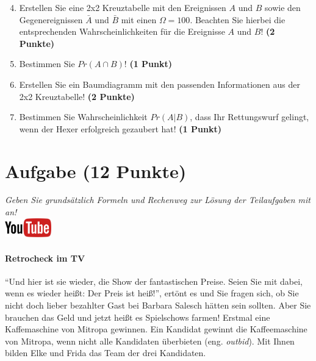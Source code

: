 \documentclass[a4paper, 9pt]{scrartcl}\usepackage[]{graphicx}\usepackage[]{xcolor}
\begin{document}
\begin{enumerate}
  \setcounter{enumi}{3}
\item Erstellen Sie eine 2x2 Kreuztabelle mit den Ereignissen $A$ und $B$
  sowie den Gegenereignissen $\bar{A}$ und $\bar{B}$ mit einen
  $\Omega = 100$. Beachten Sie hierbei die entsprechenden
  Wahrscheinlichkeiten f{\"u}r die Ereignisse $A$ und $B$! \textbf{(2 Punkte)}
\item Bestimmen Sie $Pr(A \cap B)$! \textbf{(1 Punkt)}
\item Erstellen Sie ein Baumdiagramm mit den passenden Informationen aus der 2x2
  Kreuztabelle! \textbf{(2 Punkte)}
\item Bestimmen Sie Wahrscheinlichkeit $Pr(A|B)$, dass Ihr Rettungswurf gelingt, wenn
  der Hexer erfolgreich gezaubert hat! \textbf{(1 Punkt)}
\end{enumerate}

  
\clearpage

\section{Aufgabe \hfill (12 Punkte)}

\textit{Geben Sie grunds{\"a}tzlich Formeln und Rechenweg zur L{\"o}sung der
  Teilaufgaben mit an!} \\[1Ex]

\hfill\href{https://youtu.be/9DQKaXdxT_g}{\includegraphics[width =
  2cm]{img/youtube}} %
\hspace{2Ex}

\paragraph{Retrocheck im TV}



"`Und hier ist sie wieder, die Show der fantastischen Preise. Seien Sie mit
dabei, wenn es wieder hei{\ss}t: Der Preis ist hei{\ss}!"', ert{\"o}nt es und Sie
fragen sich, ob Sie nicht doch lieber bezahlter Gast bei Barbara Salesch
h{\"a}tten sein sollten. Aber Sie brauchen das Geld und jetzt hei{\ss}t es
Spielschows farmen! Erstmal eine Kaffemaschine von Mitropa
gewinnen. Ein Kandidat gewinnt die Kaffeemaschine von Mitropa, wenn nicht alle
Kandidaten {\"u}berbieten (eng. \textit{outbid}). Mit Ihnen bilden
Elke und Frida das Team der drei Kandidaten.
\end{document}

